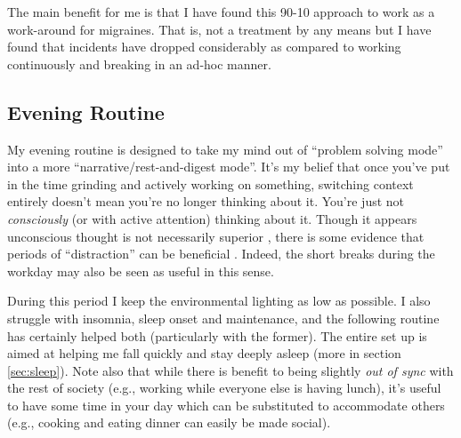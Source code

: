 \documentclass[10pt,twocolumn]{extarticle}
\begin{document}
The main benefit for me is that I have found this 90-10 approach to work as a work-around for migraines. That is, not a treatment by any means but I have found that incidents have dropped considerably as compared to working continuously and breaking in an ad-hoc manner.

\subsection{Evening Routine}
My evening routine is designed to take my mind out of ``problem solving mode'' into a more ``narrative/rest-and-digest mode''. It's my belief that once you've put in the time grinding and actively working on something, switching context entirely doesn't mean you're no longer thinking about it. You're just not \textit{consciously} (or with active attention) thinking about it. Though it appears unconscious thought is not necessarily superior \cite{dijksterhuis2006theory,huizenga2012four}, there is some evidence that periods of ``distraction'' can be beneficial \cite{ritter2014creativity,kihlstrom2013unconscious}. Indeed, the short breaks during the workday may also be seen as useful in this sense. 

During this period I keep the environmental lighting as low as possible. I also struggle with insomnia, sleep onset and maintenance, and the following routine has certainly helped both (particularly with the former). The entire set up is aimed at helping me fall quickly and stay deeply asleep (more in section \ref{sec:sleep}). Note also that while there is benefit to being slightly \textit{out of sync} with the rest of society (e.g., working while everyone else is having lunch), it's useful to have some time in your day which can be substituted to accommodate others (e.g., cooking and eating dinner can easily be made social).
\end{document}
